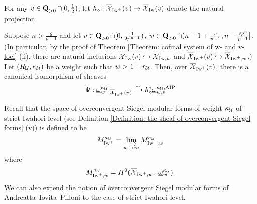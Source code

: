 For any $v\in \operatorname{\mathbf{Q}}_{>0}\cap [0, \frac{1}{2})$, let $h_{\diamond}:\overline{\operatorname{\mathcal{X}}}_{\operatorname{Iw}^+}(v)\rightarrow \overline{\operatorname{\mathcal{X}}}_{\operatorname{Iw}}(v)$ denote the natural projection.

\begin{Theorem}\label{Theorem: comparison with AIP}
Suppose $n>\frac{g}{p-1}$ and let $v\in \operatorname{\mathbf{Q}}_{>0}\cap [0, \frac{1}{2p^{n-1}})$, $w\in\operatorname{\mathbf{Q}}_{>0}\cap (n-1+\frac{v}{p-1}, n-\frac{vp^n}{p-1}]$. (In particular, by the proof of Theorem \ref{Theorem: cofinal system of w- and v-loci} (ii), there are natural inclusions $\overline{\operatorname{\mathcal{X}}}_{\operatorname{Iw}}(v)\hookrightarrow \overline{\operatorname{\mathcal{X}}}_{\operatorname{Iw}, w}$ and $\overline{\operatorname{\mathcal{X}}}_{\operatorname{Iw}^+}(v) \hookrightarrow \overline{\operatorname{\mathcal{X}}}_{\operatorname{Iw}^+, w}$.) Let $(R_{\operatorname{\mathcal{U}}}, \kappa_{\operatorname{\mathcal{U}}})$ be a weight such that $w>1+r_{\operatorname{\mathcal{U}}}$. Then, over $\overline{\operatorname{\mathcal{X}}}_{\operatorname{Iw}^+}(v)$, there is a canonical isomorphism of sheaves $$\Psi:\underline{\omega}_w^{\kappa_{\operatorname{\mathcal{U}}}}|_{\overline{\operatorname{\mathcal{X}}}_{\operatorname{Iw}^+}(v)}\xrightarrow{\sim} h_{\diamond}^*\underline{\omega}_{w, v}^{\kappa_{\operatorname{\mathcal{U}}}, \operatorname{AIP}}$$
\end{Theorem}

Recall that the space of overconvergent Siegel modular forms of weight $\kappa_{\operatorname{\mathcal{U}}}$ of strict Iwahori level (see Definition \ref{Definition: the sheaf of overconvergent Siegel forms} (v)) is defined to be
$$M^{\kappa_{\operatorname{\mathcal{U}}}}_{\operatorname{Iw}^+}=\varinjlim_{w\rightarrow \infty} M^{\kappa_{\operatorname{\mathcal{U}}}}_{\operatorname{Iw}^+,w}$$
where $$M^{\kappa_{\operatorname{\mathcal{U}}}}_{\operatorname{Iw}^+,w}=H^0(\overline{\operatorname{\mathcal{X}}}_{\operatorname{Iw}^+, w}, \,\,\underline{\omega}_w^{\kappa_{\operatorname{\mathcal{U}}}}).$$
We can also extend the notion of overconvergent Siegel modular forms of Andreatta--Iovita--Pilloni to the case of strict Iwahori level.

